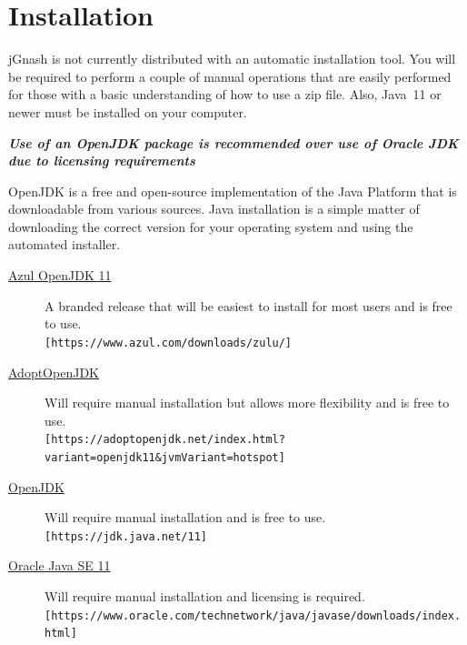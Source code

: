 \documentclass[letterpaper,12pt]{book}
\begin{document}
    \section{Installation}\label{sec:installation}
    jGnash is not currently distributed with an automatic installation tool.
    You will be required to perform a couple of manual operations that are easily performed for those with a basic
    understanding of how to use a zip file.
    Also, Java\texttrademark~11 or newer must be installed on your computer.

    \textit{\textbf{Use of an OpenJDK package is recommended over use of Oracle JDK due to licensing requirements}}

    OpenJDK is a free and open-source implementation of the Java Platform that is downloadable from various sources.
    Java installation is a simple matter of downloading the correct version for your operating system and using the
    automated installer.

    \begin{description}
        \item[\href{https://www.azul.com/downloads/zulu/}{Azul OpenJDK 11}]
        A branded release that will be easiest to install for most users and is free to use. \\
        \texttt{[https://www.azul.com/downloads/zulu/]}
        \item[\href{https://adoptopenjdk.net/index.html?variant=openjdk11&jvmVariant=hotspot}{AdoptOpenJDK}]
        Will require manual installation but allows more flexibility and is free to use. \\
        \texttt{[https://adoptopenjdk.net/index.html?variant=openjdk11\&jvmVariant=hotspot]}
        \item [\href{https://jdk.java.net/11/}{OpenJDK}]
        Will require manual installation and is free to use. \\
        \texttt{[https://jdk.java.net/11]}
        \item[\href{https://www.oracle.com/technetwork/java/javase/downloads/index.html}{Oracle Java SE 11}]
        Will require manual installation and licensing is required. \\
        \texttt{[https://www.oracle.com/technetwork/java/javase/downloads/index.html]}
    \end{description}

\end{document}
